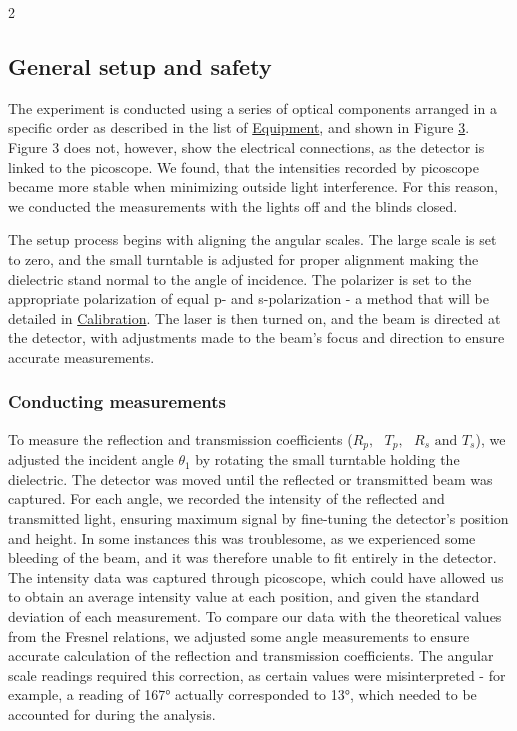 \documentclass[a4paper,oneside,article]{memoir}
\begin{document}
\begin{multicols}{2}
\subsection{General setup and safety}
The experiment is conducted using a series of optical components arranged in a specific order as described in the list of \hyperref[sec:equ]{Equipment}, and shown in Figure \hyperref[fig:setup]{3}. Figure 3 does not, however, show the electrical connections, as the detector is linked to the picoscope. We found, that the intensities recorded by picoscope became more stable when minimizing outside light interference. For this reason, we conducted the measurements with the lights off and the blinds closed.

The setup process begins with aligning the angular scales. The large scale is set to zero, and the small turntable is adjusted for proper alignment making the dielectric stand normal to the angle of incidence. The polarizer is set to the appropriate polarization of equal p- and s-polarization -  a method that will be detailed in \hyperref[sec:cal]{Calibration}. The laser is then turned on, and the beam is directed at the detector, with adjustments made to the beam’s focus and direction to ensure accurate measurements.

\subsubsection{Conducting measurements}
To measure the reflection and transmission coefficients ($R_p,\text{ } T_p, \text{ }R_s \text{ and } T_s$), we adjusted the incident angle $\theta_1$ by rotating the small turntable holding the dielectric. The detector was moved until the reflected or transmitted beam was captured. For each angle, we recorded the intensity of the reflected and transmitted light, ensuring maximum signal by fine-tuning the detector’s position and height. In some instances this was troublesome, as we experienced some bleeding of the beam, and it was therefore unable to fit entirely in the detector. The intensity data was captured through picoscope, which could have allowed us to obtain an average intensity value at each position, and given the standard deviation of each measurement. To compare our data with the theoretical values from the Fresnel relations, we adjusted some angle measurements to ensure accurate calculation of the reflection and transmission coefficients. The angular scale readings required this correction, as certain values were misinterpreted - for example, a reading of 167° actually corresponded to 13°, which needed to be accounted for during the analysis.


\end{multicols}
\end{document}
